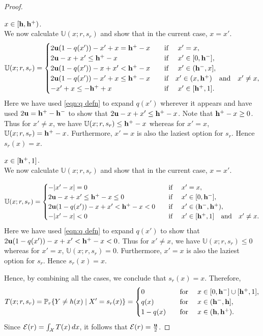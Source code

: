 \begin{proof}
   \begin{case} $ x \in [\mathbf{h}, \mathbf{h^{+}}) $.\\
 We now calculate $\mathbb{U}(x;r,s_r)$ and show that in the current case, $x=x'$.
 \begin{equation*}
    \mathbb{U}(x;r,s_r) = \begin{cases}
    2\mathbf{u}(1-q(x')) - x' + x = \mathbf{h^{+}} -x &\hbox{\quad if \quad} x'= x,\\
    2\mathbf{u} - x + x' \leq \mathbf{h^{+}} - x &\hbox{\quad if \quad} x' \in [0,\mathbf{h^{-}}],\\
    2\mathbf{u}(1-q(x')) - x + x' < \mathbf{h^{+}}- x &\hbox{\quad if \quad} x' \in (\mathbf{h^{-}},x],\\
    2\mathbf{u}(1- q(x')) - x' + x \leq \mathbf{h^{+}} - x    &\hbox{\quad if\quad} x' \in (x,\mathbf{h^{+}}) \hbox{\quad and\quad} x' \neq x,\\
    -x' + x \leq  -\mathbf{h^{+}} + x &\hbox{\quad if \quad} x' \in [\mathbf{h^{+}},1].        \end{cases}
\end{equation*}
Here we have used \eqref{eqn:q defn} to expand $q(x')$ wherever it appears and have used $2\mathbf{u} = \mathbf{h^{+}} - \mathbf{h^{-}}$ to show that $2\mathbf{u} - x + x' \leq \mathbf{h^{+}} -x$. Note that $\mathbf{h^{+}} - x \geq 0$. Thus for $x' \neq x$, we have $\mathbb{U}(x;r,s_r) \leq \mathbf{h^{+}}-x$ whereas for $x' = x$, $\mathbb{U}(x;r,s_r) = \mathbf{h^{+}}-x$. Furthermore, $x'=x$ is also the laziest option for $s_r$. Hence $s_r(x) = x$.
   \end{case}

\begin{case} $ x \in [\mathbf{h^{+}}, 1] $.\\
We now calculate $\mathbb{U}(x;r,s_r)$ and show that in the current case, $x=x'$.

 \begin{equation*}
    \mathbb{U}(x;r,s_r) = \begin{cases}
    -|x'-x| = 0 &\hbox{\quad if \quad} x'= x,\\
    2\mathbf{u} - x + x' \leq \mathbf{h^{+}} - x \leq 0 &\hbox{\quad if \quad} x' \in [0,\mathbf{h^{-}}],\\
    2\mathbf{u}(1-q(x')) - x + x' < \mathbf{h^{+}}- x < 0 &\hbox{\quad if \quad} x' \in (\mathbf{h^{-}},\mathbf{h^{+}}),\\
    -|x'-x| <  0 &\hbox{\quad if \quad} x' \in [\mathbf{h^{+}},1] \hbox{\quad and\quad} x' \neq x.       \end{cases}
\end{equation*}
Here we have used \eqref{eqn:q defn} to expand $q(x')$ to show that $2\mathbf{u}(1-q(x')) - x + x' < \mathbf{h^{+}}- x < 0$. Thus for $x' \neq x$, we have $\mathbb{U}(x;r,s_r) \leq 0$ whereas for $x' = x$, $\mathbb{U}(x;r,s_r) = 0$. Furthermore, $x'=x$ is also the laziest option for $s_r$. Hence $s_r(x) = x$.
\end{case}
\noindent Hence, by combining all the cases, we conclude that $ s_r(x) = x $. Therefore,
    \[
    T(x; r, s_r) = \mathbb{P}_{r}\{Y \neq h(x) \mid X' = s_r(x)\} = \begin{cases}
        0 & \hbox{\quad for \quad} x \in [0, \mathbf{h^{-}}] \cup [\mathbf{h^{+}}, 1], \\
        q(x) & \hbox{\quad for \quad} x \in (\mathbf{h^{-}}, \mathbf{h}], \\
        1 - q(x) & \hbox{\quad for \quad} x \in (\mathbf{h}, \mathbf{h^{+}}).
    \end{cases}
    \]
    Since $ \mathcal{E}(r) = \int_{\mathcal{X}} T(x) \, dx $, it follows that $ \mathcal{E}(r) = \frac{\mathbf{u}}{2} $.
\end{proof}

